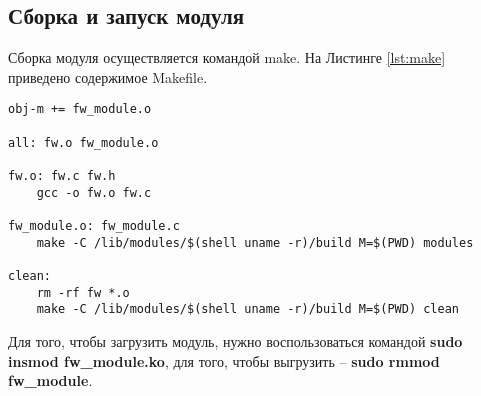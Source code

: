 \subsection{Сборка и запуск модуля}
Сборка модуля осуществляется командой make. На Листинге \ref{lst:make} приведено содержимое Makefile.

\begin{lstlisting}[caption = {Makefile}, label=lst:make]
obj-m += fw_module.o

all: fw.o fw_module.o

fw.o: fw.c fw.h
	gcc -o fw.o fw.c	

fw_module.o: fw_module.c
	make -C /lib/modules/$(shell uname -r)/build M=$(PWD) modules

clean:
	rm -rf fw *.o
	make -C /lib/modules/$(shell uname -r)/build M=$(PWD) clean
\end{lstlisting}

Для того, чтобы загрузить модуль, нужно воспользоваться командой \textbf{sudo insmod fw\_module.ko}, для того, чтобы выгрузить -- \textbf{sudo rmmod fw\_module}. \newline

